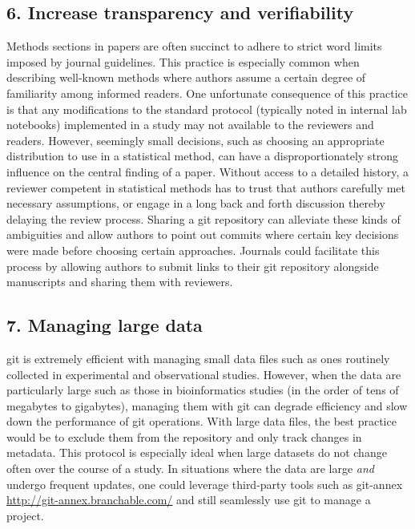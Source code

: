 \documentclass[]{article}
\begin{document}
\subsection{6. Increase transparency and verifiability}

Methods sections in papers are often succinct to adhere to strict word
limits imposed by journal guidelines. This practice is especially common
when describing well-known methods where authors assume a certain degree
of familiarity among informed readers. One unfortunate consequence of
this practice is that any modifications to the standard protocol
(typically noted in internal lab notebooks) implemented in a study may
not available to the reviewers and readers. However, seemingly small
decisions, such as choosing an appropriate distribution to use in a
statistical method, can have a disproportionately strong influence on
the central finding of a paper. Without access to a detailed history, a
reviewer competent in statistical methods has to trust that authors
carefully met necessary assumptions, or engage in a long back and forth
discussion thereby delaying the review process. Sharing a git repository
can alleviate these kinds of ambiguities and allow authors to point out
commits where certain key decisions were made before choosing certain
approaches. Journals could facilitate this process by allowing authors
to submit links to their git repository alongside manuscripts and
sharing them with reviewers.

\subsection{7. Managing large data}

git is extremely efficient with managing small data files such as ones
routinely collected in experimental and observational studies. However,
when the data are particularly large such as those in bioinformatics
studies (in the order of tens of megabytes to gigabytes), managing them
with git can degrade efficiency and slow down the performance of git
operations. With large data files, the best practice would be to exclude
them from the repository and only track changes in metadata. This
protocol is especially ideal when large datasets do not change often
over the course of a study. In situations where the data are large
\emph{and} undergo frequent updates, one could leverage third-party
tools such as git-annex
\href{http://git-annex.branchable.com/}{http://git-annex.branchable.com/}
and still seamlessly use git to manage a project.
\end{document}
